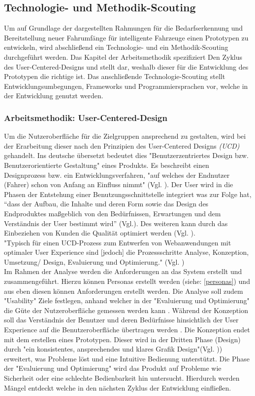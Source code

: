 \subsection{Technologie- und Methodik-Scouting}
Um auf Grundlage der dargestellten Rahmungen für die Bedarfserkennung und Bereitstellung neuer Fahrumfänge für intelligente Fahrzeuge einen Prototypen zu entwickeln, wird abschließend ein Technologie- und ein Methodik-Scouting durchgeführt werden. Das Kapitel der Arbeitsmethodik spezifiziert Den Zyklus des User-Centered-Designs und stellt dar, weshalb dieser für die Entwicklung des Prototypen die richtige ist. Das anschließende Technologie-Scouting stellt Entwicklungsumbegungen, Frameworks und Programmiersprachen vor, welche in der Entwicklung genutzt werden. 
\subsubsection{Arbeitsmethodik: User-Centered-Design}
Um die Nutzeroberfläche für die Zielgruppen ansprechend zu gestalten, wird bei der Erarbeitung dieser nach den Prinzipien des User-Centered Designs \textit{(UCD)} gehandelt. Ins deutsche übersetzt bedeutet dies "Benutzerzentriertes Design bzw. Benutzerorientierte Gestaltung" eines Produkts. Es beschreibt einen Designprozess bzw. ein Entwicklungsverfahren, "auf welches der Endnutzer (Fahrer) schon von Anfang an Einfluss nimmt" (Vgl. \cite[S.763]{bainbridge2004berkshire}). Der User wird in die Phasen der Entstehung einer Benutzungsschnittstelle integriert was zur Folge hat, “dass der Aufbau, die Inhalte und deren Form sowie das Design des Endproduktes maßgeblich von den Bedürfnissen, Erwartungen und dem Verständnis der User bestimmt wird” (Vgl.\cite{rosenbusch}). Des weiteren kann durch das Einbeziehen von Kunden die Qualität optimiert werden (Vgl. \cite[S. 14]{weisgerber}).\\

"Typisch für einen UCD-Prozess zum Entwerfen von Webanwendungen mit optimaler User Experience sind [jedoch] die Prozessschritte Analyse, Konzeption, Umsetzung/ Design, Evaluierung und Optimierung." (Vgl. \cite{seobility})\\
Im Rahmen der Analyse werden die Anforderungen an das System erstellt und zusammengeführt. Hierzu können Personas erstellt werden (siehe: \ref{personas}) und aus eben diesen können Anforderungen erstellt werden. Die Analyse soll zudem "Usability"\cite{usability-toolkit} Ziele festlegen, anhand welcher in der "Evaluierung und Optimierung" die Güte der Nutzeroberfläche gemessen werden kann \cite{seobility}. Während der Konzeption soll das Verständnis der Benutzer und deren Bedürfnisse hinsichtlich der User Experience auf die Benutzeroberfläche übertragen werden \cite[(ebd.)]{seobility}. Die Konzeption endet mit dem erstellen eines Prototypen. Dieser wird in der Dritten Phase (Design) durch "ein konsistentes, ansprechendes und klares Grafik Design"(Vgl. )\cite{seobility}) erweitert, was Probleme löst und eine Intuitive Bedienung unterstützt. Die Phase der "Evaluierung und Optimierung" wird das Produkt auf Probleme wie Sicherheit oder eine schlechte Bedienbarkeit hin untersucht. Hierdurch werden Mängel entdeckt welche in den nächsten Zyklus der Entwicklung einfließen.\\

